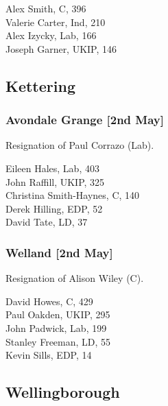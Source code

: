 \documentclass[a4paper,openany,10pt]{book}
\begin{document}
Alex Smith, C, 396\\
Valerie Carter, Ind, 210\\
Alex Izycky, Lab, 166\\
Joseph Garner, UKIP, 146\\


\subsection*{Kettering}

\subsubsection*{Avondale Grange \hspace*{\fill}\nolinebreak[1]%
\enspace\hspace*{\fill}
[2nd May]}


Resignation of Paul Corrazo (Lab).



Eileen Hales, Lab, 403\\
John Raffill, UKIP, 325\\
{Christina Smith-Haynes}, C, 140\\
Derek Hilling, EDP, 52\\
David Tate, LD, 37\\


\subsubsection*{Welland \hspace*{\fill}\nolinebreak[1]%
\enspace\hspace*{\fill}
[2nd May]}


Resignation of Alison Wiley (C).



David Howes, C, 429\\
Paul Oakden, UKIP, 295\\
John Padwick, Lab, 199\\
Stanley Freeman, LD, 55\\
Kevin Sills, EDP, 14\\


\subsection*{Wellingborough}
\end{document}
